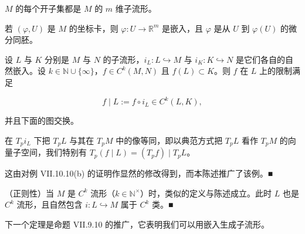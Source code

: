 \begin{remark}
\begin{items}
$ M $ 的每个开子集都是 $ M $ 的 $ m $ 维子流形。

\item

若 $ (\varphi,U) $ 是 $ M $ 的坐标卡，则 $ \varphi:U\to\mathbb{R}^m $ 是嵌入，且 $ \varphi $ 是从 $ U $ 到 $ \varphi(U) $ 的微分同胚。

\item

设 $ L $ 与 $ K $ 分别是 $ M $ 与 $ N $ 的子流形，$ i_L:L\hookrightarrow M $ 与 $ i_K:K\hookrightarrow N $ 是它们各自的自然嵌入。设 $ k\in\mathbb{N}\cup\{\infty\} $，$ f\in C^k(M,N) $ 且 $ f(L)\subset K $。则 $ f $ 在 $ L $ 上的限制满足

\[
f\mid L:=f\circ i_L\in C^k(L,K),
\]

并且下面的图交换。

\end{items}


在 $ T_p i_L $ 下把 $ T_p L $ 与其在 $ T_p M $ 中的像等同，即以典范方式把 $ T_p L $ 看作 $ T_p M $ 的向量子空间，我们特别有 $ T_p(f\mid L)=(T_p f)\mid T_p L $。

\proofhead
这由对例 VII.10.10(b) 的证明作显然的修改得到，而本陈述推广了该例。\nobreak\hspace{0.35em}■

\begin{items}
\item[（k）]

（正则性）当 $ M $ 是 $ C^k $ 流形（$ k\in\mathbb{N}^\times $）时，类似的定义与陈述成立。此时 $ L $ 也是 $ C^k $ 流形，且自然包含 $ i:L\hookrightarrow M $ 属于 $ C^k $ 类。\nobreak\hspace{0.35em}■

\end{items}

下一个定理是命题 VII.9.10 的推广，它表明我们可以用嵌入生成子流形。

\end{remark}

